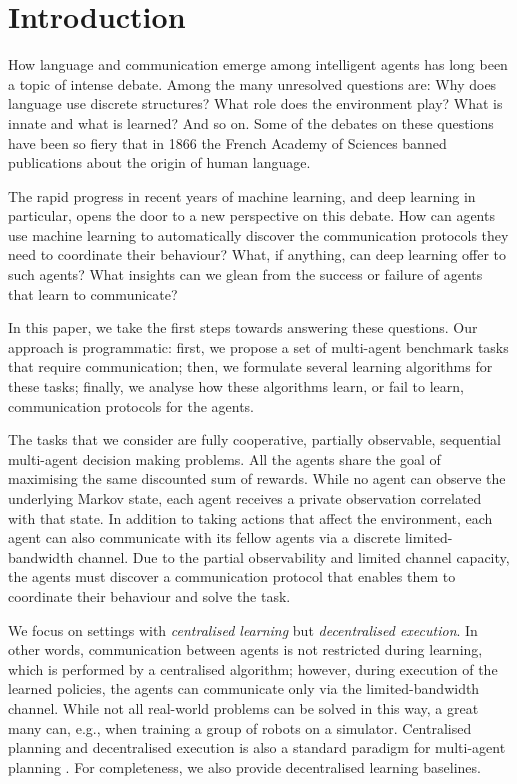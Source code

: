 \section{Introduction}
\label{sec:introduction}

How language and communication emerge among intelligent agents has long been a topic of intense debate. Among the many unresolved questions are: Why does language use discrete structures? What role does the environment play? What is innate and what is learned? And so on. Some of the debates on these questions have been so fiery that in 1866 the French Academy of Sciences banned publications about the origin of human language.

The rapid progress in recent years of machine learning, and deep learning in particular, opens the door to a new perspective on this debate.  How can agents use machine learning to automatically discover the communication protocols they need to coordinate their behaviour?  What, if anything, can deep learning offer to such agents?  What insights can we glean from the success or failure of agents that learn to communicate?

In this paper, we take the first steps towards answering these questions.  Our approach is programmatic: first, we propose a set of multi-agent benchmark tasks that require communication; then, we formulate several learning algorithms for these tasks; finally, we analyse how these algorithms learn, or fail to learn, communication protocols for the agents.

The tasks that we consider are fully cooperative, partially observable, sequential multi-agent decision making problems.  All the agents share the goal of maximising the same discounted sum of rewards.  While no agent can observe the underlying Markov state, each agent receives a private observation correlated with that state.  In addition to taking actions that affect the environment, each agent can also communicate with its fellow agents via a discrete limited-bandwidth channel.  Due to the partial observability and limited channel capacity, the agents must discover a communication protocol that enables them to coordinate their behaviour and solve the task.

We focus on settings with \emph{centralised learning} but \emph{decentralised execution}.  In other words, communication between agents is not restricted during learning, which is performed by a centralised algorithm; however, during execution of the learned policies, the agents can communicate only via the limited-bandwidth channel.  While not all real-world problems can be solved in this way, a great many can, e.g., when training a group of robots on a simulator.  Centralised planning and decentralised execution is also a standard paradigm for multi-agent planning \cite{kraemer2016multi}. For completeness, we also provide decentralised learning baselines. 

